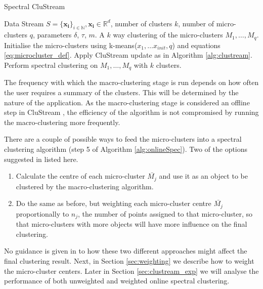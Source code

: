 \begin{algorithm}
\caption{Spectral CluStream}
\begin{algorithmic}[1]
\REQUIRE  Data Stream $S = \{\boldsymbol{x_i} \}_{i \in \mathbb{N}}, \boldsymbol{x_i} \in \mathbb{R}^d$, number of clusters $k$, number of micro-clusters $q$, parameters $\delta$, $\tau$, $m$.
\ENSURE A $k$ way clustering of the micro-clusters $M_1, \ldots, M_q$.
\STATE Initialise the micro-clusters using k-means($x_1, \hdots x_{init},q$) and equations \eqref{eq:microcluster_def}.
 \STATE Apply CluStream update as in Algorithm \ref{alg:clustream}.
   \STATE Perform spectral clustering on $M_1, \ldots, M_q$ with $k$ clusters.
\ENDIF
\ENDFOR

\end{algorithmic}
\label{alg:onlineSpec}
\end{algorithm}

The frequency with which the macro-clustering stage is run depends on how often the user requires a summary of the clusters. This will be determined by the nature of the application. As the macro-clustering stage is considered an offline step in CluStream \citep{Aggarwal2003}, the efficiency of the algorithm is not compromised by running the macro-clustering more frequently. 

There are a couple of possible ways to feed the micro-clusters into a spectral clustering algorithm (step 5 of Algorithm \ref{alg:onlineSpec}). Two of the options suggested in \cite{Zhang1996a} listed here. 

\begin{enumerate}
\item Calculate the centre of each micro-cluster $\bar{M_j}$ and use it as an object to be clustered by the macro-clustering algorithm.
\item Do the same as before, but weighting each micro-cluster centre $\bar{M_j}$ proportionally to $n_j$, the number of points assigned to that micro-cluster, so that micro-clusters with more objects will have more influence on the final clustering.
\end{enumerate}

No guidance is given in \cite{Zhang1996a} to how these two different approaches might affect the final clustering result. Next, in Section \ref{sec:weighting} we describe how to weight the micro-cluster centers. Later in Section \ref{sec:clustream_exp} we will analyse the performance of both unweighted and weighted online spectral clustering.

